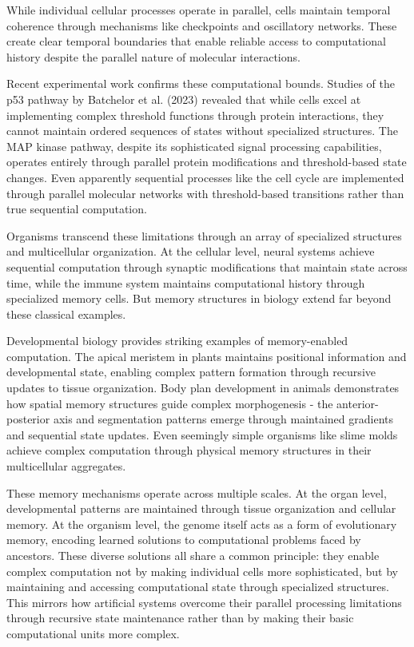 \documentclass[12pt]{article}
\begin{document}
While individual cellular processes operate in parallel, cells maintain temporal coherence through mechanisms like checkpoints and oscillatory networks. These create clear temporal boundaries that enable reliable access to computational history despite the parallel nature of molecular interactions.

Recent experimental work confirms these computational bounds. Studies of the p53 pathway by Batchelor et al. (2023) revealed that while cells excel at implementing complex threshold functions through protein interactions, they cannot maintain ordered sequences of states without specialized structures. The MAP kinase pathway, despite its sophisticated signal processing capabilities, operates entirely through parallel protein modifications and threshold-based state changes. Even apparently sequential processes like the cell cycle are implemented through parallel molecular networks with threshold-based transitions rather than true sequential computation.

Organisms transcend these limitations through an array of specialized structures and multicellular organization. At the cellular level, neural systems achieve sequential computation through synaptic modifications that maintain state across time, while the immune system maintains computational history through specialized memory cells. But memory structures in biology extend far beyond these classical examples.

Developmental biology provides striking examples of memory-enabled computation. The apical meristem in plants maintains positional information and developmental state, enabling complex pattern formation through recursive updates to tissue organization. Body plan development in animals demonstrates how spatial memory structures guide complex morphogenesis - the anterior-posterior axis and segmentation patterns emerge through maintained gradients and sequential state updates. Even seemingly simple organisms like slime molds achieve complex computation through physical memory structures in their multicellular aggregates.

These memory mechanisms operate across multiple scales. At the organ level, developmental patterns are maintained through tissue organization and cellular memory. At the organism level, the genome itself acts as a form of evolutionary memory, encoding learned solutions to computational problems faced by ancestors. These diverse solutions all share a common principle: they enable complex computation not by making individual cells more sophisticated, but by maintaining and accessing computational state through specialized structures. This mirrors how artificial systems overcome their parallel processing limitations through recursive state maintenance rather than by making their basic computational units more complex.
\end{document}
